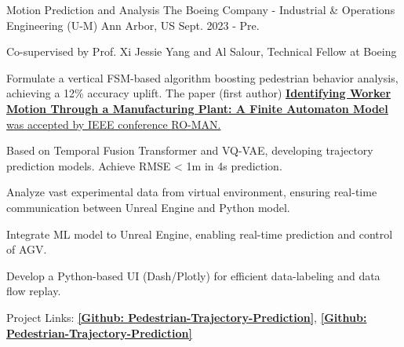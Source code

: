 \begin{cventries}
  \begin{cventry}
    {Motion Prediction and Analysis}
    {The Boeing Company - Industrial \& Operations Engineering (U-M)}
    {Ann Arbor, US}
    {Sept. 2023 - Pre.}
    {
      \begin{cvitems}
      \item {Co-supervised by Prof. Xi Jessie Yang and Al Salour, Technical Fellow at Boeing}
      \item {Formulate a vertical FSM-based algorithm boosting pedestrian behavior analysis, achieving a 12\% accuracy uplift.
      The paper (first author) \href{https://ieeexplore.ieee.org/document/10731360}{\underline{\textbf{Identifying Worker Motion Through a Manufacturing Plant: A Finite Automaton Model}} was accepted by IEEE conference RO-MAN.}}
      \item {Based on Temporal Fusion Transformer and VQ-VAE, developing trajectory prediction models. Achieve RMSE < 1m in 4s prediction.}
      \item {Analyze vast experimental data from virtual environment, ensuring real-time communication between Unreal Engine and Python model.}
      \item {Integrate ML model to Unreal Engine, enabling real-time prediction and control of AGV. }
      \item {Develop a Python-based UI (Dash/Plotly) for efficient data-labeling and data flow replay.}
      \item {Project Links: \href{https://github.com/priest-yang/Pedestrian-Trajectory-Prediction}{\textbf{[Github: Pedestrian-Trajectory-Prediction]}}, 
      \href{https://github.com/priest-yang/UE-integrated-pipeline}{\textbf{[Github: Pedestrian-Trajectory-Prediction]}}}
    \end{cvitems}
    }
  
  \end{cventry}
  

\end{cventries}
